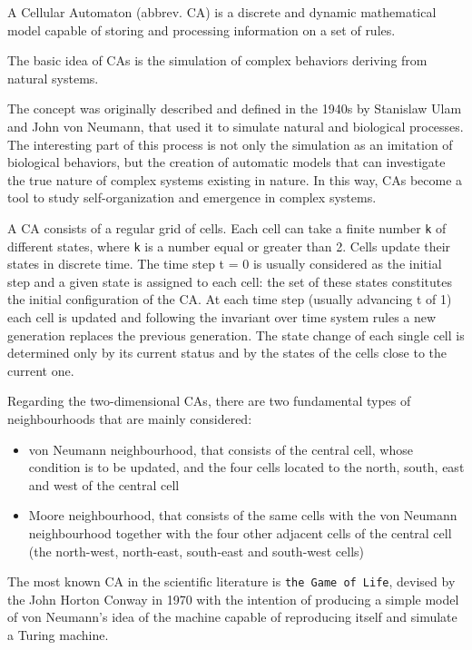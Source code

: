 A Cellular Automaton (abbrev. CA) is a discrete and dynamic mathematical model capable of storing and processing information on a set of rules.
\par
The basic idea of CAs is the simulation of complex behaviors deriving from natural systems.
\par
The concept was originally described and defined in the 1940s by Stanislaw Ulam and John von Neumann, that used it to simulate natural and biological processes. The interesting part of this process is not only the simulation as an imitation of biological behaviors, but the creation of automatic models that can investigate the true nature of complex systems existing in nature. In this way, CAs become a tool to study self-organization and emergence in complex systems.
\par
A CA consists of a regular grid of cells. Each cell can take a finite number \texttt{k} of different states, where \texttt{k} is a number equal or greater than 2. Cells update their states in discrete time. The time step t = 0 is usually considered as the initial step and a given state is assigned to each cell: the set of these states constitutes the initial configuration of the CA.
At each time step (usually advancing t of 1) each cell is updated and following the invariant over time system rules a new generation replaces the previous generation. The state change of each single cell is determined only by its current status and by the states of the cells close to the current one.
\par
Regarding the two-dimensional CAs, there are two fundamental types of neighbourhoods that are mainly considered:
\begin{itemize}
\item von Neumann neighbourhood, that consists of the central cell, whose condition is to be updated, and the four cells located to the north, south, east and west of the central cell
\item Moore neighbourhood, that consists of the same cells with the von Neumann neighbourhood together with the four other adjacent cells of the central cell (the north-west, north-east, south-east and south-west cells)
\end{itemize}
\par
The most known CA in the scientific literature is \texttt{the Game of Life}, devised by the John Horton Conway in 1970 with the intention of producing a simple model of von Neumann's idea of the machine capable of reproducing itself and simulate a Turing machine. 
\par
